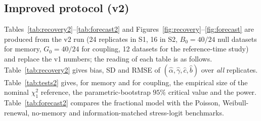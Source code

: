 \documentclass[11pt,a4paper]{article}
\begin{document}
\subsection*{Improved protocol (v2)}\label{sec:resv2}
Tables~\ref{tab:recovery2}--\ref{tab:forecast2} and Figures~\ref{fig:recovery}--\ref{fig:forecast} are produced from the v2 run (24 replicates in S1, 16 in S2, $B_0=40/24$ null datasets for memory, $G_0=40/24$ for coupling, 12 datasets for the reference-time study) and replace the v1 numbers; the reading of each table is as follows. Table~\ref{tab:recovery2} gives bias, SD and RMSE of $(\hat\alpha,\hat\gamma,\hat c,\hat b)$ over \emph{all} replicates. Table~\ref{tab:tests2} gives, for memory and for coupling, the empirical size of the nominal $\chi^2_1$ reference, the parametric-bootstrap $95\%$ critical value and the power. Table~\ref{tab:forecast2} compares the fractional model with the Poisson, Weibull-renewal, no-memory and information-matched stress-logit benchmarks.
\end{document}
